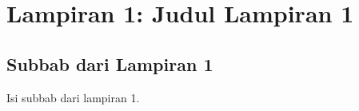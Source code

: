 \chapter*{Lampiran 1: Judul Lampiran 1}
\section*{Subbab dari Lampiran 1}
Isi subbab dari lampiran 1.
